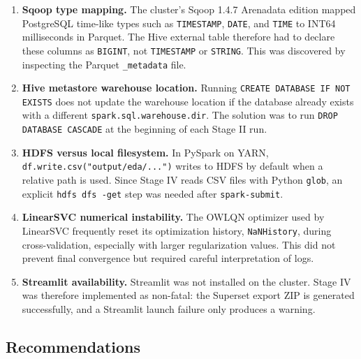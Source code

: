 \documentclass[12pt,a4paper]{article}
\begin{document}
\begin{enumerate}
    \item \textbf{Sqoop type mapping.} The cluster's Sqoop 1.4.7 Arenadata edition mapped PostgreSQL time-like types such as \texttt{TIMESTAMP}, \texttt{DATE}, and \texttt{TIME} to INT64 milliseconds in Parquet. The Hive external table therefore had to declare these columns as \texttt{BIGINT}, not \texttt{TIMESTAMP} or \texttt{STRING}. This was discovered by inspecting the Parquet \texttt{\_metadata} file.

    \item \textbf{Hive metastore warehouse location.} Running \texttt{CREATE DATABASE IF NOT EXISTS} does not update the warehouse location if the database already exists with a different \texttt{spark.sql.warehouse.dir}. The solution was to run \texttt{DROP DATABASE CASCADE} at the beginning of each Stage II run.

    \item \textbf{HDFS versus local filesystem.} In PySpark on YARN, \texttt{df.write.csv("output/eda/...")} writes to HDFS by default when a relative path is used. Since Stage IV reads CSV files with Python \texttt{glob}, an explicit \texttt{hdfs dfs -get} step was needed after \texttt{spark-submit}.

    \item \textbf{LinearSVC numerical instability.} The OWLQN optimizer used by LinearSVC frequently reset its optimization history, \texttt{NaNHistory}, during cross-validation, especially with larger regularization values. This did not prevent final convergence but required careful interpretation of logs.

    \item \textbf{Streamlit availability.} Streamlit was not installed on the cluster. Stage IV was therefore implemented as non-fatal: the Superset export ZIP is generated successfully, and a Streamlit launch failure only produces a warning.
\end{enumerate}

\subsection{Recommendations}
\end{document}
